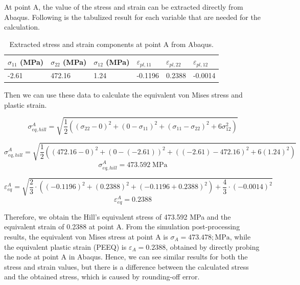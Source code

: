 \documentclass[12pt]{article}
\begin{document}
At point A, the value of the stress and strain can be extracted directly from Abaqus. Following is the tabulized result for each 
variable that are needed for the calculation.
\begin{table}[H]
    \centering
    \caption{Extracted stress and strain components at point A from Abaqus.}
    \label{tab:pointA-results}
    \begin{tabular}{llllll}
        \toprule
        $\sigma_{11}$ (MPa) & $\sigma_{22}$ (MPa) & $\sigma_{12}$ (MPa) & $\varepsilon_{pl,11}$ & $\varepsilon_{pl,22}$ & $\varepsilon_{pl,12}$\\
        \midrule
        -2.61 & 472.16 & 1.24 & -0.1196 & 0.2388 & -0.0014\\
        \bottomrule
    \end{tabular}
\end{table}

Then we can use these data to calculate the equivalent von Mises stress and plastic strain. 

\begin{equation}
    \sigma_{eq, hill}^A = \sqrt{\frac{1}{2}((\sigma_{22}-0)^2 + (0-\sigma_{11})^2 + (\sigma_{11}-\sigma_{22})^2 + 6\sigma_{12}^2)} 
\end{equation}

\begin{equation}
    \sigma_{eq, hill}^A = \sqrt{\frac{1}{2}((472.16-0)^2 + (0-(-2.61))^2 + ((-2.61)-472.16)^2 + 6(1.24)^2)}
\end{equation}
\begin{equation}
    \sigma_{eq, hill}^A = 473.592 \; \text{MPa}
\end{equation}

\begin{equation}
    \varepsilon_{eq}^A = \sqrt{\frac{2}{3}\cdot((-0.1196)^2 + (0.2388)^2 + \left( -0.1196 + 0.2388 \right)^2) + \frac{4}{3}\cdot(-0.0014)^2}
\end{equation}
\begin{equation}
    \varepsilon_{eq}^A = 0.2388
\end{equation}

\hspace{2em}Therefore, we obtain the Hill's equivalent stress of 473.592 MPa and the equivalent strain of 0.2388 at point A. 
From the simulation post-processing results, the equivalent von Mises stress at point A is $\sigma_{A} = 473.478 ; \text{MPa}$, 
while the equivalent plastic strain (PEEQ) is $\varepsilon_{A} = 0.2388$, obtained by directly probing the node at point A in Abaqus. 
Hence, we can see similar results for both the stress and strain values, but there is a difference between the calculated stress and 
the obtained stress, which is caused by rounding-off error.
\vspace{1em}
\end{document}
